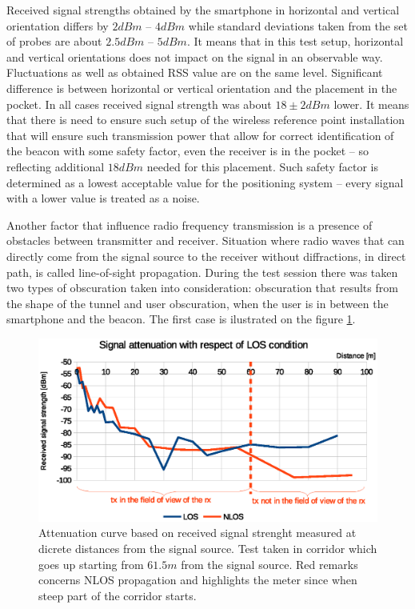 \documentclass[../main.tex]{subfiles}
\begin{document}
Received signal strengths obtained by the smartphone in horizontal and vertical orientation differs by $2 dBm$ -- $4 dBm$ while standard deviations taken from the set of probes are about $2.5 dBm$ -- $5 dBm$. It means that in this test setup, horizontal and vertical orientations does not impact on the signal in an observable way. Fluctuations as well as obtained RSS value are on the same level. Significant difference is between horizontal or vertical orientation and the placement in the pocket. In all cases received signal strength was about $18\pm2 dBm$ lower. It means that there is need to ensure such setup of the wireless reference point installation that will ensure such transmission power that allow for correct identification of the beacon with some safety factor, even the receiver is in the pocket -- so reflecting additional $18dBm$ needed for this placement. Such safety factor is determined as a lowest acceptable value for the positioning system -- every signal with a lower value is treated as a noise.

Another factor that influence radio frequency transmission is a presence of obstacles between transmitter and receiver. Situation where radio waves that can directly come from the signal source to the receiver without diffractions, in direct path, is called line-of-sight propagation. During the test session there was taken two types of obscuration taken into consideration: obscuration that results from the shape of the tunnel and user obscuration, when the user is in between the smartphone and the beacon. The first case is ilustrated on the figure \ref{fig:tests_case4_los}.

\begin{figure}[ht]
\includegraphics[width=\textwidth, keepaspectratio]{pictures/tests_case4_los}
\centering
\caption{Attenuation curve based on received signal strenght measured at dicrete distances from the signal source. Test taken in corridor which goes up starting from $61.5 m$ from the signal source. Red remarks concerns NLOS propagation and highlights the meter since when steep part of the corridor starts.}
\label{fig:tests_case4_los}
\end{figure}
\end{document}
